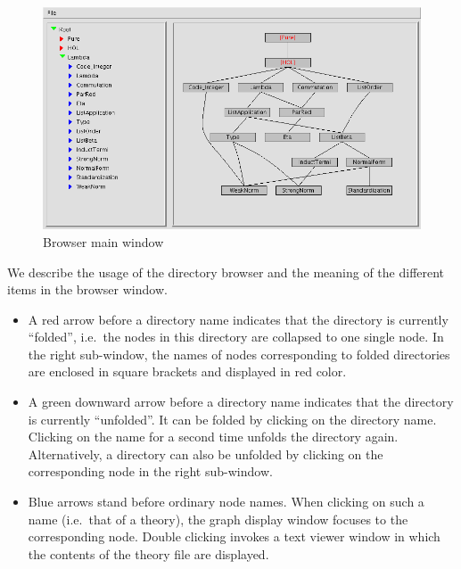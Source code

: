 \begin{isabellebody}
\begin{isamarkuptext}
  \begin{figure}[ht]
  \includegraphics[width=\textwidth]{browser_screenshot}
  \caption{\label{fig:browserwindow} Browser main window}
  \end{figure}%
\end{isamarkuptext}%
\isamarkuptrue%
%
\isamarkuptrue%
%
\begin{isamarkuptext}%
We describe the usage of the directory browser and the meaning of
  the different items in the browser window.

  \begin{itemize}

  \item A red arrow before a directory name indicates that the
  directory is currently ``folded'', i.e.~the nodes in this directory
  are collapsed to one single node. In the right sub-window, the names
  of nodes corresponding to folded directories are enclosed in square
  brackets and displayed in red color.

  \item A green downward arrow before a directory name indicates that
  the directory is currently ``unfolded''. It can be folded by
  clicking on the directory name.  Clicking on the name for a second
  time unfolds the directory again.  Alternatively, a directory can
  also be unfolded by clicking on the corresponding node in the right
  sub-window.

  \item Blue arrows stand before ordinary node names. When clicking on
  such a name (i.e.\ that of a theory), the graph display window
  focuses to the corresponding node. Double clicking invokes a text
  viewer window in which the contents of the theory file are
  displayed.


\end{itemize}
\end{isamarkuptext}
\end{isabellebody}
